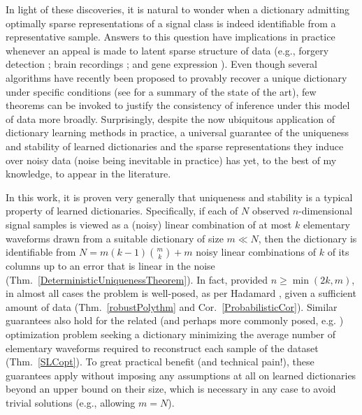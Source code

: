 In light of these discoveries, it is natural to wonder when a dictionary admitting optimally sparse representations of a signal class is indeed identifiable from a representative sample. Answers to this question have implications in practice whenever an appeal is made to latent sparse structure of data (e.g., forgery detection \cite{hughes2010, olshausen2010applied}; brain recordings \cite{jung2001imaging, agarwal2014spatially, lee2016sparse}; and gene expression \cite{wu2016stability}). 
Even though several algorithms have recently been proposed to provably recover a unique dictionary under specific conditions (see \cite[Sec.~I-E]{Sun16} for a summary of the state of the art), few theorems can be invoked to justify the consistency of inference under this model of data more broadly. Surprisingly, despite the now ubiquitous application of dictionary learning methods in practice, a universal guarantee of the uniqueness and stability of learned dictionaries and the sparse representations they induce over noisy data (noise being inevitable in practice) has yet, to the best of my knowledge, to appear in the literature.

In this work, it is proven very generally that uniqueness and stability is a typical property of learned dictionaries. Specifically, if each of $N$ observed $n$-dimensional signal samples is viewed as a (noisy) linear combination of at most $k$ elementary waveforms drawn from a suitable dictionary of size $m \ll N$, then the dictionary is identifiable from \mbox{$N = m(k-1){m \choose k} + m$} noisy linear combinations of $k$ of its columns up to an error that is linear in the noise (Thm.~\ref{DeterministicUniquenessTheorem}). In fact, provided $n \geq \min(2k,m)$, in almost all cases the problem is well-posed, as per Hadamard \cite{Hadamard1902}, given a sufficient amount of data (Thm.~\ref{robustPolythm} and Cor.~\ref{ProbabilisticCor}). 
Similar guarantees also hold for the related (and perhaps more commonly posed, e.g. \cite{rehnsommer2007}) optimization problem seeking a dictionary minimizing the average number of elementary waveforms required to reconstruct each sample of the dataset (Thm.~\ref{SLCopt}). To great practical benefit (and technical pain!), these guarantees apply without imposing any assumptions at all on learned dictionaries beyond an upper bound on their size, which is necessary in any case to avoid trivial solutions (e.g., allowing $m = N$). %

